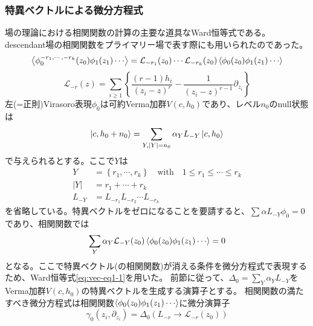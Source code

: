 \documentclass[11pt, aps, longbibliography]{article}
\numberwithin{equation}{section}
\begin{document}
        \subsubsection{特異ベクトルによる微分方程式}
        場の理論における相関関数の計算の主要な道具なWard恒等式である。descendant場の相関関数をプライマリー場で表す際にも用いられたのであった。
        \begin{equation}\label{eq:vec-eq1-1}
            \expval{\phi_0^{-r_1,\cdots,-r_k}(z_0)\phi_1(z_1)\cdots} = \mathcal{L}_{-r_1}(z_0)\cdots \mathcal{L}_{-r_k}(z_0)\expval{\phi_0(z_0)\phi_1(z_1)\cdots}
        \end{equation}
        \begin{equation}\label{eq:vec-eq1-2}
            \mathcal{L}_{-r}(z) = \sum_{i \geq 1}\left\{ \frac{(r-1)h_i}{(z_i-z)^r} - \frac{1}{(z_i-z)^{r-1}}\partial_{z_i} \right\}
        \end{equation}
        左(=正則)Virasoro表現$\phi_0$は可約Verma加群$V(c,h_0)$であり、レベル$n_0$のnull状態は
        \begin{equation}\label{eq:vec-eq1-3}
            \ket{c,h_0+n_0} = \sum_{Y,|Y|=n_0}\alpha_Y L_{-Y}\ket{c,h_0}
        \end{equation}
        で与えられるとする。ここで$Y$は
        \begin{align}
            Y &= \left\{r_1,\cdots,r_k\right\} \quad \text{with} \quad 1\leq r_1 \leq \cdots \leq r_k \\
            |Y| &= r_1 + \cdots + r_k \\
            L_{-Y} &= L_{-r_1}L_{-r_2}\cdots L_{-r_k}
        \end{align}
        を省略している。特異ベクトルをゼロになることを要請すると、$\sum \alpha L_{-Y}\phi_0=0$であり、相関関数では
        \begin{equation}\label{eq:vec-eq1-4}
            \sum_{Y}\alpha_Y \mathcal{L}_{-Y}(z_0)\expval{\phi_0(z_0)\phi_1(z_1)\cdots} = 0
        \end{equation}
        となる。ここで特異ベクトル(の相関関数)が消える条件を微分方程式で表現するため、Ward恒等式\eqref{eq:vec-eq1-1}を用いた。
        前節に従って、$\Delta_0 = \sum_Y \alpha_Y L_{-Y}$をVerma加群$V(c,h_0)$の特異ベクトルを生成する演算子とする。
        相関関数の満たすべき微分方程式は相関関数$\expval{\phi_0(z_0)\phi_1(z_1)\cdots}$に微分演算子
        \begin{equation}\label{eq:vec-eq1-5}
            \gamma_0(z_i,\partial_{z_i}) = \Delta_0(L_{-r} \rightarrow \mathcal{L}_{-r}(z_0))
        \end{equation}
\end{document}

